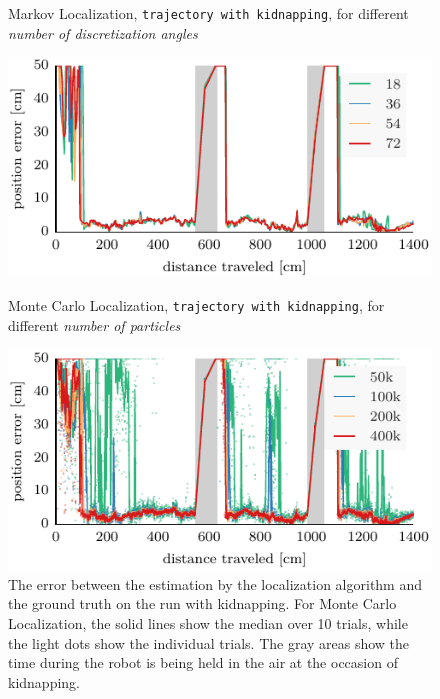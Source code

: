 \documentclass[letterpaper, 10pt, conference]{ieeeconf}
\begin{document}
\begin{figure}

\begin{center}
Markov Localization, \texttt{trajectory with kidnapping}, for different \emph{number of discretization angles}
\end{center}
\includegraphics{ml-whole_random_long-xy}

\vspace{.3em}

\begin{center}
Monte Carlo Localization, \texttt{trajectory with kidnapping}, for different \emph{number of particles}
\end{center}
\includegraphics{mcl-whole_random_long-xy}

\caption{The error between the estimation by the localization algorithm and the ground truth on the run with kidnapping.
For Monte Carlo Localization, the solid lines show the median over 10 trials, while the light dots show the individual trials.
The gray areas show the time during the robot is being held in the air at the occasion of kidnapping.}
\label{fig:whole-runs-random-long}
\end{figure}
\end{document}
